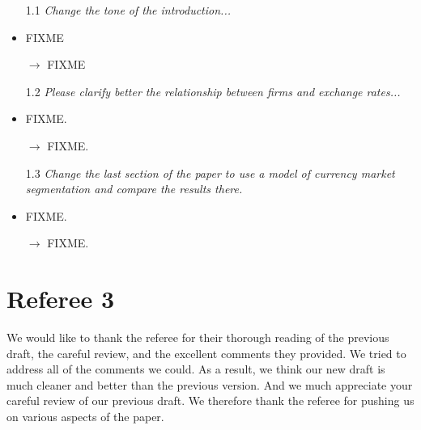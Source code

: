 \begin{itemize}
\item[1.1] \textit{Change the tone of the introduction...}

\item FIXME

\item[$\rightarrow $] FIXME


\item[1.2] \textit{Please clarify better the relationship between
    firms and exchange rates...}

\item FIXME.

\item[$\rightarrow $] FIXME.


\item[1.3] \textit{Change the last section of the paper to use a model
    of currency market segmentation and compare the results there.}

\item FIXME.

\item[$\rightarrow $] FIXME.

\end{itemize}


\newpage



\section*{Referee 3}
\noindent We would like to thank the referee for their thorough
reading of the previous draft, the careful review, and the excellent
comments they provided. We tried to address all of the comments we
could. As a result, we think our new draft is much cleaner and better
than the previous version. And we much appreciate your careful review
of our previous draft. We therefore thank the referee for pushing us
on various aspects of the paper.

